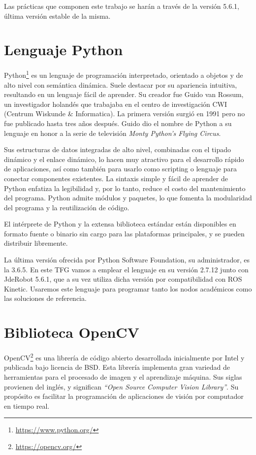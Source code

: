 Las prácticas que componen este trabajo se harán a través de la versión 5.6.1, última versión estable de la misma.

\section{Lenguaje Python}
Python\footnote{\url{https://www.python.org/}} es un lenguaje de programación interpretado, orientado a objetos y de alto nivel con semántica dinámica. Suele destacar por su apariencia intuitiva, resultando en un lenguaje fácil de aprender. Su creador fue Guido van Rossum, un investigador holandés que trabajaba en el centro de investigación CWI (Centrum Wiskunde \& Informatica). La primera versión surgió en 1991 pero no fue publicado hasta tres años después. Guido dio el nombre de Python a su lenguaje en honor a la serie de televisión \textit{Monty Python’s Flying Circus}.

Sus estructuras de datos integradas de alto nivel, combinadas con el tipado dinámico y el enlace dinámico, lo hacen muy atractivo para el desarrollo rápido de aplicaciones, así como también para usarlo como scripting o lenguaje para conectar componentes existentes. La sintaxis simple y fácil de aprender de Python enfatiza la legibilidad y, por lo tanto, reduce el costo del mantenimiento del programa. Python admite módulos y paquetes, lo que fomenta la modularidad del programa y la reutilización de código. 

El intérprete de Python y la extensa biblioteca estándar están disponibles en formato fuente o binario sin cargo para las plataformas principales, y se pueden distribuir libremente.

La última versión ofrecida por Python Software Foundation, su administrador, es la 3.6.5. En este TFG vamos a emplear el lenguaje en su versión 2.7.12 junto con JdeRobot 5.6.1, que a su vez utiliza dicha versión por compatibilidad con ROS Kinetic. Usaremos este lenguaje para programar tanto los nodos académicos como las soluciones de referencia.

\section{Biblioteca OpenCV}
OpenCV\footnote{\url{https://opencv.org/}} es una librería de código abierto desarrollada inicialmente por Intel y publicada bajo licencia de BSD. Esta librería implementa gran variedad de herramientas para el procesado de imagen y el aprendizaje máquina. Sus siglas provienen del inglés, y significan \textit{“Open Source Computer Vision Library”}. Su propósito es facilitar la programación de aplicaciones de visión por computador en tiempo real.

